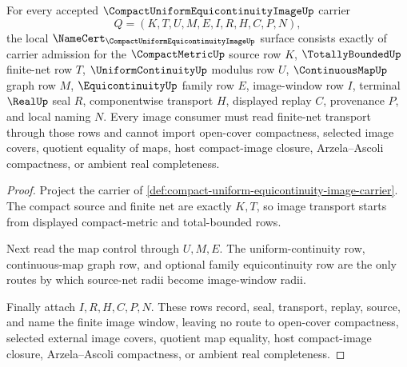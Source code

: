 \begin{theorem}
\label{thm:compact-uniform-equicontinuity-image-namecert-obligations}
For every accepted $\CompactUniformEquicontinuityImageUp$ carrier
$$
Q=(K,T,U,M,E,I,R,H,C,P,N),
$$
the local $\NameCert_{\CompactUniformEquicontinuityImageUp}$ surface consists exactly of carrier admission for the $\CompactMetricUp$ source row $K$, $\TotallyBoundedUp$ finite-net row $T$, $\UniformContinuityUp$ modulus row $U$, $\ContinuousMapUp$ graph row $M$, $\EquicontinuityUp$ family row $E$, image-window row $I$, terminal $\RealUp$ seal $R$, componentwise transport $H$, displayed replay $C$, provenance $P$, and local naming $N$. Every image consumer must read finite-net transport through those rows and cannot import open-cover compactness, selected image covers, quotient equality of maps, host compact-image closure, Arzela--Ascoli compactness, or ambient real completeness.
\end{theorem}
\begin{proof}
Project the carrier of \autoref{def:compact-uniform-equicontinuity-image-carrier}. The compact source and finite net are exactly $K,T$, so image transport starts from displayed compact-metric and total-bounded rows.

Next read the map control through $U,M,E$. The uniform-continuity row, continuous-map graph row, and optional family equicontinuity row are the only routes by which source-net radii become image-window radii.

Finally attach $I,R,H,C,P,N$. These rows record, seal, transport, replay, source, and name the finite image window, leaving no route to open-cover compactness, selected external image covers, quotient map equality, host compact-image closure, Arzela--Ascoli compactness, or ambient real completeness.
\end{proof}


